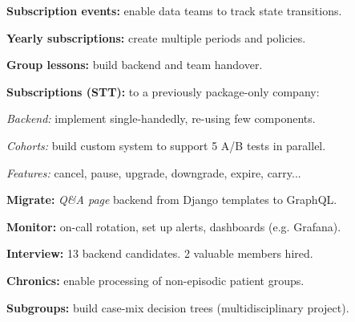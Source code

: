 \documentclass[a4paper]{MagicalCV}
\begin{document}
\hfill
\begin{minipage}[t]{0.66\textwidth}


\hfill
{}
\vspace{\topsep} %
\begin{tightemize}

\item {\bf Subscription events:} enable data teams to track state transitions.
\item {\bf Yearly subscriptions:} create multiple periods and policies.
\item {\bf Group lessons:} build backend and team handover.
\end{tightemize}
\sectionsep

\hfill
{}
\vspace{\topsep} %
\begin{tightemize}
\item {\bf Subscriptions (STT):} to a previously package-only company:
\begin{tightemize}
\item {\it Backend:} implement single-handedly, re-using few components.
\item {\it Cohorts:} build custom system to support 5 A/B tests in parallel.
\item {\it Features:} cancel, pause, upgrade, downgrade, expire, carry...
\end{tightemize}
\item {\bf Migrate:} {\it Q\&A page} backend from Django templates to GraphQL.
\item {\bf Monitor:} on-call rotation, set up alerts, dashboards (e.g. Grafana).
\item {\bf Interview:} 13 backend candidates. 2 valuable members hired.
\end{tightemize}
\sectionsep

\hfill
{}
\vspace{\topsep} %
\begin{tightemize}
\item {\bf Chronics:} enable processing of non-episodic patient groups.
\item {\bf Subgroups:} build case-mix decision trees (multidisciplinary project).
\end{tightemize}
\sectionsep


\end{minipage}
\end{document}
